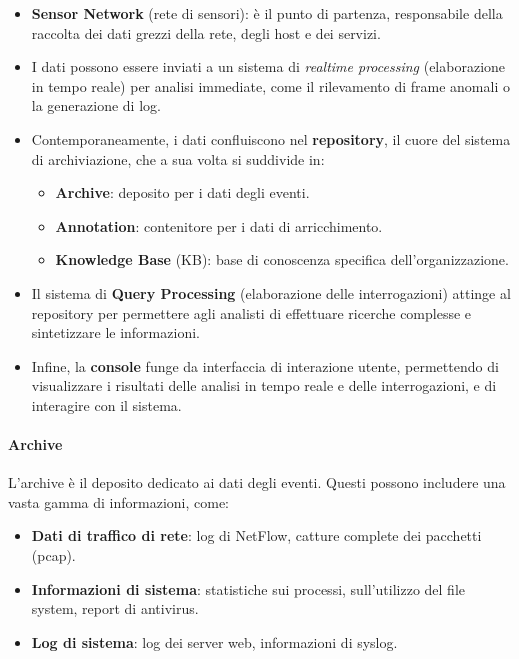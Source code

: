 \begin{itemize}
\item \textbf{Sensor Network} (rete di sensori): è il punto di partenza,
responsabile della raccolta dei dati grezzi della rete, degli host e dei servizi.
\item I dati possono essere inviati a un sistema di \textit{realtime processing}
(elaborazione in tempo reale) per analisi immediate,
come il rilevamento di frame anomali o la generazione di log.
\item Contemporaneamente, i dati confluiscono nel \textbf{repository},
il cuore del sistema di archiviazione, che a sua volta si suddivide in:
\begin{itemize}
\item \textbf{Archive}: deposito per i dati degli eventi.
\item \textbf{Annotation}: contenitore per i dati di arricchimento.
\item \textbf{Knowledge Base} (KB): base di conoscenza specifica dell'organizzazione.
\end{itemize}
\item Il sistema di \textbf{Query Processing} (elaborazione delle interrogazioni)
attinge al repository per permettere agli analisti di effettuare ricerche complesse
e sintetizzare le informazioni.
\item Infine, la \textbf{console} funge da interfaccia di interazione utente,
permettendo di visualizzare i risultati delle analisi in tempo reale e delle interrogazioni,
e di interagire con il sistema.
\end{itemize}

\paragraph{Archive}

L'archive è il deposito dedicato ai dati degli eventi.
Questi possono includere una vasta gamma di informazioni, come:

\begin{itemize}
\item \textbf{Dati di traffico di rete}: log di NetFlow, catture complete dei pacchetti (pcap).
\item \textbf{Informazioni di sistema}: statistiche sui processi, sull'utilizzo del file system,
report di antivirus.
\item \textbf{Log di sistema}: log dei server web, informazioni di syslog.
\end{itemize}

